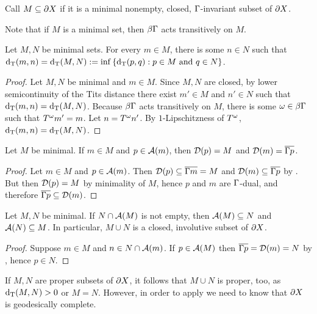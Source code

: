 \documentclass{amsart}
\renewcommand{\setp}[2]{\left\{#1 : #2\right\}}
\begin{document}
\begin{definition}
Call $M \subseteq \partial X$  if it is a minimal nonempty, closed, $\Gamma$-invariant subset of $\partial X$. \end{definition}

Note that if $M$ is a minimal set, then $\beta \Gamma$ acts transitively on $M$.

\begin{lemma}
Let $M,N$ be minimal sets.  For every $m \in M$, there is some $n \in N$ such that $\dT(m, n) = \dT(M, N) := \inf \setp{\dT(p, q)}{p \in M \text{ and } q \in N}$. \end{lemma}

\begin{proof}
Let $M,N$ be minimal and $m \in M$.
Since $M,N$ are closed, by lower semicontinuity of the Tits distance there exist $m' \in M$ and $n' \in N$ such that $\operatorname{d_T}(m, n) = \operatorname{d_T}(M, N)$.
Because $\beta \Gamma$ acts transitively on $M$, there is some $\omega \in \beta \Gamma$ such that $T^{\omega} m' = m$.
Let $n = T^{\omega} n'$.  By $1$-Lipschitzness of $T^{\omega}$, $\operatorname{d_T}(m, n) = \operatorname{d_T}(M, N)$.
\end{proof}


\begin{lemma} 		\label{antipodal to minimal}
Let $M$ be minimal.
If $m \in M$ and $p \in \operatorname{\mathcal A}(m)$, then $\operatorname{\mathcal D}(p) = M$ and $\operatorname{\mathcal D}(m) = \overline{\Gamma p}$. \end{lemma}

\begin{proof}
Let $m \in M$ and $p \in \operatorname{\mathcal A}(m)$.  Then $\operatorname{\mathcal D}(p) \subseteq \overline{\Gamma m} = M$ and $\operatorname{\mathcal D}(m) \subseteq \overline{\Gamma p}$ by .  But then $\operatorname{\mathcal D}(p) = M$ by minimality of $M$, hence $p$ and $m$ are $\Gamma$-dual, and therefore $\overline{\Gamma p} \subseteq \operatorname{\mathcal D}(m)$.
\end{proof}

\begin{lemma}			\label{closed involutive pair}
Let $M,N$ be minimal.
If $N \cap \operatorname{\mathcal A}(M)$ is not empty, then $\operatorname{\mathcal A}(M) \subseteq N$ and $\operatorname{\mathcal A}(N) \subseteq M$.
In particular, $M \cup N$ is a closed, involutive subset of $\partial X$. \end{lemma}

\begin{proof}
Suppose $m \in M$ and $n \in N \cap \operatorname{\mathcal A}(m)$.  If $p \in \operatorname{\mathcal A}(M)$ then $\overline{\Gamma p} = \operatorname{\mathcal D}(m) = N$ by , hence $p \in N$.
\end{proof}

\begin{remark}
If $M,N$ are proper subsets of $\partial X$, it follows that $M \cup N$ is proper, too, as $\operatorname{d_T} (M,N) > 0$ or $M = N$.  However, in order to apply  we need to know that $\partial X$ is geodesically complete.
\end{remark}
\end{document}
